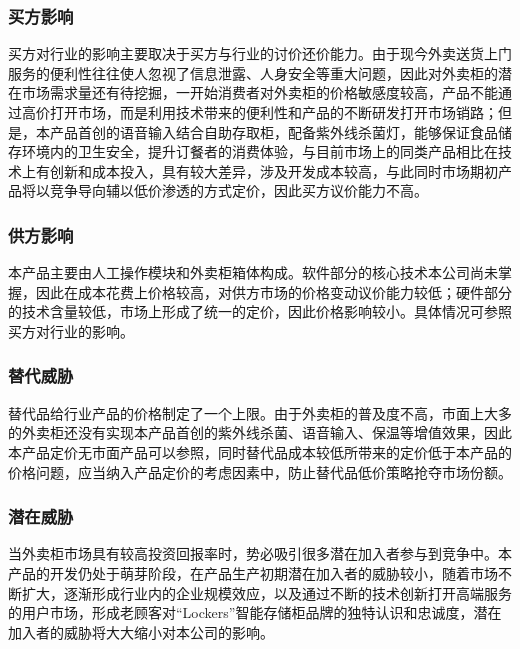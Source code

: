 \documentclass[violet]{main}
\begin{document}
			\subsubsection{买方影响}
				买方对行业的影响主要取决于买方与行业的讨价还价能力。由于现今外卖送货上门服务的便利性往往使人忽视了信息泄露、人身安全等重大问题，因此对外卖柜的潜在市场需求量还有待挖掘，一开始消费者对外卖柜的价格敏感度较高，产品不能通过高价打开市场，而是利用技术带来的便利性和产品的不断研发打开市场销路；但是，本产品首创的语音输入结合自助存取柜，配备紫外线杀菌灯，能够保证食品储存环境内的卫生安全，提升订餐者的消费体验，与目前市场上的同类产品相比在技术上有创新和成本投入，具有较大差异，涉及开发成本较高，与此同时市场期初产品将以竞争导向辅以低价渗透的方式定价，因此买方议价能力不高。
			\subsubsection{供方影响}
				本产品主要由人工操作模块和外卖柜箱体构成。软件部分的核心技术本公司尚未掌握，因此在成本花费上价格较高，对供方市场的价格变动议价能力较低；硬件部分的技术含量较低，市场上形成了统一的定价，因此价格影响较小。具体情况可参照买方对行业的影响。
			\subsubsection{替代威胁}
				替代品给行业产品的价格制定了一个上限。由于外卖柜的普及度不高，市面上大多的外卖柜还没有实现本产品首创的紫外线杀菌、语音输入、保温等增值效果，因此本产品定价无市面产品可以参照，同时替代品成本较低所带来的定价低于本产品的价格问题，应当纳入产品定价的考虑因素中，防止替代品低价策略抢夺市场份额。
			\subsubsection{潜在威胁}
				当外卖柜市场具有较高投资回报率时，势必吸引很多潜在加入者参与到竞争中。本产品的开发仍处于萌芽阶段，在产品生产初期潜在加入者的威胁较小，随着市场不断扩大，逐渐形成行业内的企业规模效应，以及通过不断的技术创新打开高端服务的用户市场，形成老顾客对“Lockers”智能存储柜品牌的独特认识和忠诚度，潜在加入者的威胁将大大缩小对本公司的影响。
\end{document}
